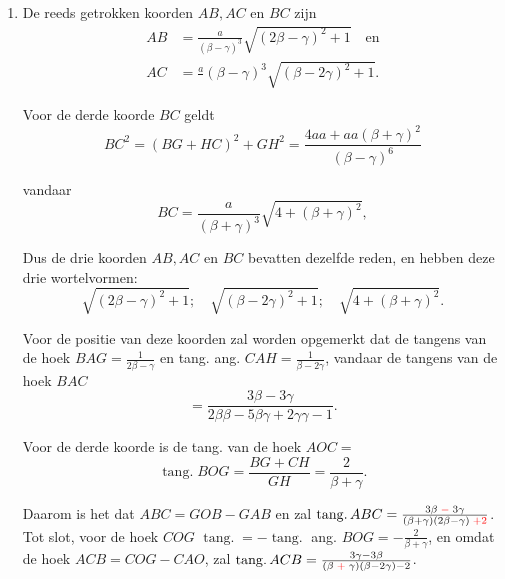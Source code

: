 \documentclass[10pt,a4paper]{article}
\newcommand{\switchenum}{\setcounter{enumi}{\arabic{enumi}-1}\switchcolumn}
\DeclareMathOperator{\tang}{tang.}
\begin{document}
\begin{paracol}{2}
\begin{enumerate}[topsep=1px]
		\switchenum
		\item De reeds getrokken koorden $AB, AC$ en $BC$ zijn
		\begin{align*}
			AB &= \frac{a}{(\beta-\gamma)^3}\sqrt{(2\beta-\gamma)^2 +1} \quad \text{en}\\
			AC & = \frac{a}{}(\beta-\gamma)^3\sqrt{(\beta - 2\gamma)^2+1}.
		\end{align*}
		\par Voor de derde koorde $BC$ geldt
		\[
			BC^2 = (BG + HC)^2 + GH^2 = \frac{4aa+aa(\beta+ \gamma)^2}{(\beta - \gamma )^6}
		\]
		\par vandaar
		\[
			BC = \frac{a}{(\beta+\gamma)^3} \sqrt{4+(\beta+\gamma)^2},
		\]
		\par Dus de drie koorden $AB, AC$ en $BC$ bevatten dezelfde reden, en hebben deze drie wortelvormen:
		\[
			\sqrt{(2\beta-\gamma)^2+1}; \quad \sqrt{(\beta-2\gamma)^2+1}; \quad \sqrt{4+(\beta+\gamma)^2}.
		\]
		\par Voor de positie van deze koorden zal worden opgemerkt dat de tangens van de hoek $BAG = \frac{1}{2\beta- \gamma}$ en tang. ang. $CAH = \frac{1}{\beta - 2\gamma}$, vandaar de tangens van de hoek $BAC$
		\[
			= \frac{3\beta - 3\gamma}{2\beta \beta - 5\beta \gamma + 2\gamma \gamma -1}.
		\]
		\par Voor de derde koorde is de tang. van de hoek $AOC=$
		\[
			\tang BOG = \frac{BG + CH}{GH} = \frac{2}{\beta + \gamma}.
		\]
		\par Daarom is het dat $ABC = GOB - GAB$ en zal $\tang ABC = \frac{3\beta \;{\color{red}-}\; 3\gamma}{(\beta+\gamma)(2\beta - \gamma)\;{\color{red}+2}}$. Tot slot, voor de hoek $COG$ $\tang = -\tang$ ang. $BOG = -\frac{2}{\beta+\gamma}$, en omdat de hoek  $ACB = COG-CAO$, zal $\tang ACB = \frac{3\gamma-3\beta}{(\beta \;{\color{red}+}\; \gamma)(\beta - 2\gamma)-2}$.
		\switchcolumn*
		

\end{enumerate}
\end{paracol}
\end{document}
